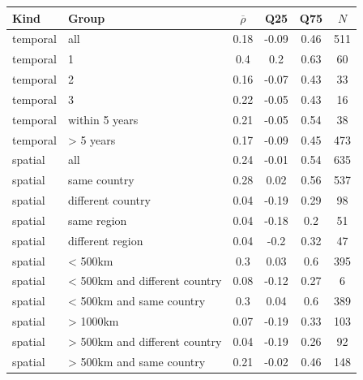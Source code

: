 \begin{tabular}{llcccc}
    \toprule
    Kind & Group & $\overline{\rho}$ & Q25 & Q75 & $N$ \\
    \hline
    temporal & all & 0.18 & -0.09 & 0.46 & 511 \\
    temporal & 1 & 0.4 & 0.2 & 0.63 & 60 \\
    temporal & 2 & 0.16 & -0.07 & 0.43 & 33 \\
    temporal & 3 & 0.22 & -0.05 & 0.43 & 16 \\
    temporal & within 5 years & 0.21 & -0.05 & 0.54 & 38 \\
    temporal & > 5 years & 0.17 & -0.09 & 0.45 & 473 \\
    spatial & all & 0.24 & -0.01 & 0.54 & 635 \\
    spatial & same country & 0.28 & 0.02 & 0.56 & 537 \\
    spatial & different country & 0.04 & -0.19 & 0.29 & 98 \\
    spatial & same region & 0.04 & -0.18 & 0.2 & 51 \\
    spatial & different region & 0.04 & -0.2 & 0.32 & 47 \\
    spatial & < 500km & 0.3 & 0.03 & 0.6 & 395 \\
    spatial & < 500km and different country & 0.08 & -0.12 & 0.27 & 6 \\
    spatial & < 500km and same country & 0.3 & 0.04 & 0.6 & 389 \\
    spatial & > 1000km & 0.07 & -0.19 & 0.33 & 103 \\
    spatial & > 500km and different country & 0.04 & -0.19 & 0.26 & 92 \\
    spatial & > 500km and same country & 0.21 & -0.02 & 0.46 & 148 \\
    \bottomrule
\end{tabular}
